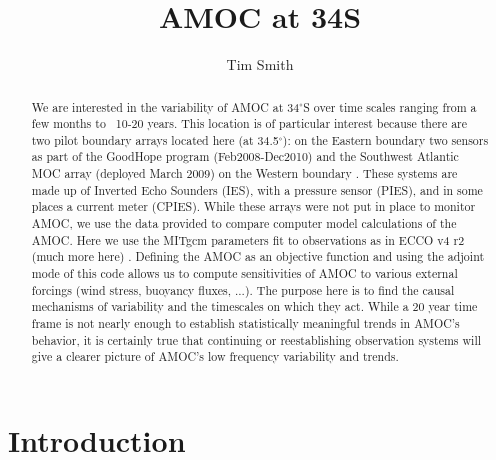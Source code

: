 \documentclass[a4paper,11pt]{article}
\title{\vspace{-10ex}AMOC at 34S}
\author{Tim Smith}
\date{\vspace{-3ex}}
\begin{document}
\maketitle

\begin{abstract}
  We are interested in the variability of AMOC at 34$^{\circ}$S over time scales ranging from a few months to ~10-20 years. This location is of particular interest because there are two pilot boundary arrays located here (at 34.5$^{\circ}$): on the Eastern boundary two sensors as part of the GoodHope program (Feb2008-Dec2010) and the Southwest Atlantic MOC array (deployed March 2009) on the Western boundary \cite{meinenSamoc}. These systems are made up of Inverted Echo Sounders (IES), with a pressure sensor (PIES), and in some places a current meter (CPIES). While these arrays were not put in place to monitor AMOC, we use the data provided to compare computer model calculations of the AMOC. Here we use the MITgcm parameters fit to observations as in ECCO v4 r2 (much more here) \cite{forgetEccov4}. Defining the AMOC as an objective function and using the adjoint mode of this code allows us to compute sensitivities of AMOC to various external forcings (wind stress, buoyancy fluxes, ...). The purpose here is to find the causal mechanisms of variability and the timescales on which they act. While a 20 year time frame is not nearly enough to establish statistically meaningful trends in AMOC's behavior, it is certainly true that continuing or reestablishing observation systems will give a clearer picture of AMOC's low frequency variability and trends. 
\end{abstract}

\section{Introduction} 
\label{intro}
	
\end{document}
